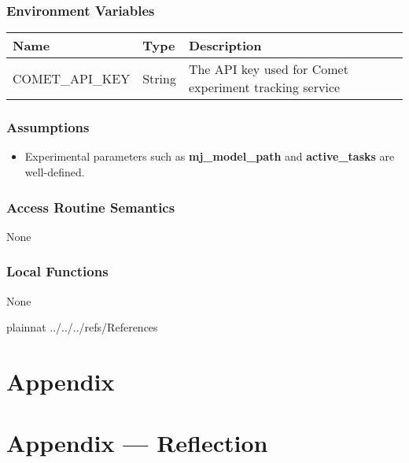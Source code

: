 \documentclass[12pt, titlepage]{article}
\begin{document}
\subsubsection{Environment Variables}
\begin{center}
  \begin{tabular}{p{4cm} p{4cm} p{6cm}}
  \hline
  \textbf{Name} & \textbf{Type} & \textbf{Description} \\
  \hline
  COMET\_API\_KEY & String & The API key used for Comet experiment tracking service \\
  \hline
  \end{tabular}
  \end{center}

\subsubsection{Assumptions}
\begin{itemize}
  \item Experimental parameters such as \textbf{mj\_model\_path} and \textbf{active\_tasks} are well-defined. 
\end{itemize}

\subsubsection{Access Routine Semantics}
None

\subsubsection{Local Functions}
None

\newpage

 {plainnat}
 {../../../refs/References}

\newpage

\section{Appendix} \label{Appendix}


\newpage{}

\section*{Appendix --- Reflection}

\end{document}
